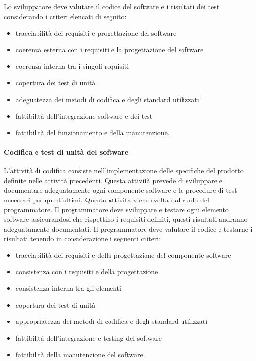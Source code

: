 \documentclass[../../norme-di-progetto.tex]{subfiles}
\begin{document}
Lo sviluppatore deve valutare il codice del software e i risultati dei test considerando i criteri elencati di seguito:

\begin{itemize}
  \item tracciabilità dei requisiti e progettazione del software
  \item coerenza esterna con i requisiti e la progettazione del software
  \item coerenza interna tra i singoli requisiti
  \item copertura dei test di unità
  \item adeguatezza dei metodi di codifica e degli standard utilizzati
  \item fattibilità dell'integrazione software e dei test
  \item fattibilità del funzionamento e della manutenzione.
\end{itemize}

\paragraph{Codifica e test di unità del software}%
\label{par:codifica_test_software}
L'attività di codifica consiste nell'implementazione delle specifiche del prodotto definite nelle attività precedenti.
Questa attività prevede di sviluppare e documentare adeguatamente ogni componente software e le procedure di test necessari per quest'ultimi.
Questa attività viene svolta dal ruolo del programmatore.
Il programmatore deve sviluppare e testare ogni elemento software assicurandosi che rispettino i requisiti definiti, questi risultati andranno adeguatamente documentati.
Il programmatore deve valutare il codice e testarne i risultati tenendo in considerazione i seguenti criteri:
\begin{itemize}
    \item tracciabilità dei requisiti e della progettazione del componente software
    \item consistenza con i requisiti e della progettazione
    \item consistenza interna tra gli elementi
    \item copertura dei test di unità
    \item appropriatezza dei metodi di codifica e degli standard utilizzati
    \item fattibilità dell'integrazione e testing del software
    \item fattibilità della manutenzione del software.
\end{itemize}
\end{document}
